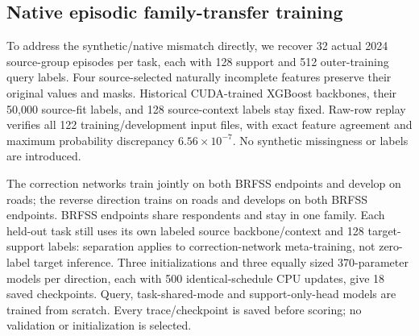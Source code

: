 \documentclass[10pt]{article}
\begin{document}
\subsection{Native episodic family-transfer training}
To address the synthetic/native mismatch directly, we recover 32 actual 2024 source-group episodes per task, each with 128 support and 512 outer-training query labels. Four source-selected naturally incomplete features preserve their original values and masks. Historical CUDA-trained XGBoost backbones, their 50,000 source-fit labels, and 128 source-context labels stay fixed. Raw-row replay verifies all 122 training/development input files, with exact feature agreement and maximum probability discrepancy $6.56\times10^{-7}$. No synthetic missingness or labels are introduced.

The correction networks train jointly on both BRFSS endpoints and develop on roads; the reverse direction trains on roads and develops on both BRFSS endpoints. BRFSS endpoints share respondents and stay in one family. Each held-out task still uses its own labeled source backbone/context and 128 target-support labels: separation applies to correction-network meta-training, not zero-label target inference. Three initializations and three equally sized 370-parameter models per direction, each with 500 identical-schedule CPU updates, give 18 saved checkpoints. Query, task-shared-mode and support-only-head models are trained from scratch. Every trace/checkpoint is saved before scoring; no validation or initialization is selected.
\end{document}
